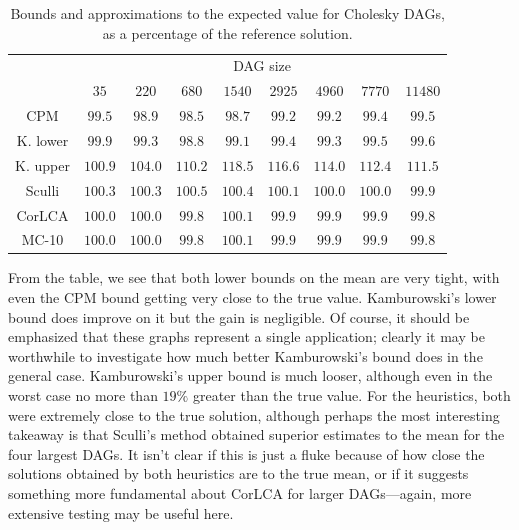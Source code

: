 \documentclass[12pt]{article}
\begin{document}
\begin{table}
	\caption{Bounds and approximations to the expected value for Cholesky DAGs, as a percentage of the reference solution.} 
	\begin{center}	
		\begin{tabular}{c c c c c c c c c}
                  \cmidrule{1-9}
                  & \multicolumn{8}{c}{DAG size} \\
                  \cmidrule{2-9}
			& $35$ & $220$ & $680$ & $1540$ & $2925$ & $4960$ & $7770$ & $11480$\\
			\cmidrule{1-9}
			CPM & $99.5$ & $98.9$ & $98.5$ & $98.7$ & $99.2$ & $99.2$ & $99.4$ & $99.5$\\
                  K. lower & $99.9$ & $99.3$ & $98.8$ & $99.1$ & $99.4$ & $99.3$ & $99.5$ & $99.6$\\
                  K. upper & $100.9$ & $104.0$ & $110.2$ & $118.5$ & $116.6$ & $114.0$ & $112.4$ & $111.5$\\
                  Sculli & $100.3$ & $100.3$ & $100.5$ & $100.4$ & $100.1$ & $100.0$ & $100.0$ & $99.9$\\
                  CorLCA & $100.0$ & $100.0$ & $99.8$ & $100.1$ & $99.9$ & $99.9$ & $99.9$ & $99.8$\\
                  MC-10 & $100.0$ & $100.0$ & $99.8$ & $100.1$ & $99.9$ & $99.9$ & $99.9$ & $99.8$\\ %
			\bottomrule
		\end{tabular}
		\label{tb.mean_existing}
	\end{center}	
      \end{table}

      From the table, we see that both lower bounds on the mean are very tight, with even the CPM bound getting very close to the true value. Kamburowski's lower bound does improve on it but the gain is negligible. Of course, it should be emphasized that these graphs represent a single application; clearly it may be worthwhile to investigate how much better Kamburowski's bound does in the general case. Kamburowski's upper bound is much looser, although even in the worst case no more than $19\%$ greater than the true value. For the heuristics, both were extremely close to the true solution, although perhaps the most interesting takeaway is that Sculli's method obtained superior estimates to the mean for the four largest DAGs. It isn't clear if this is just a fluke because of how close the solutions obtained by both heuristics are to the true mean, or if it suggests something more fundamental about CorLCA for larger DAGs---again, more extensive testing may be useful here.       
\end{document}
